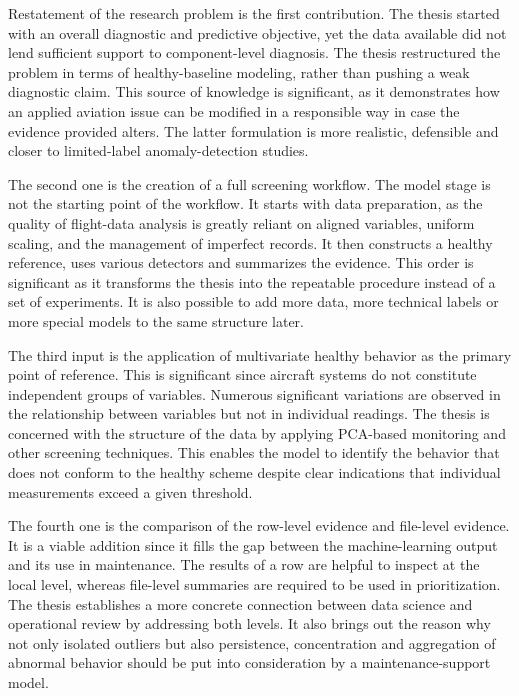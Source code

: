 \documentclass[12pt,a4paper]{report}
\begin{document}
	Restatement of the research problem is the first contribution. The thesis started with an overall diagnostic and predictive objective, yet the data available did not lend sufficient support to component-level diagnosis. The thesis restructured the problem in terms of healthy-baseline modeling, rather than pushing a weak diagnostic claim. This source of knowledge is significant, as it demonstrates how an applied aviation issue can be modified in a responsible way in case the evidence provided alters. The latter formulation is more realistic, defensible and closer to limited-label anomaly-detection studies.
	
	The second one is the creation of a full screening workflow. The model stage is not the starting point of the workflow. It starts with data preparation, as the quality of flight-data analysis is greatly reliant on aligned variables, uniform scaling, and the management of imperfect records. It then constructs a healthy reference, uses various detectors and summarizes the evidence. This order is significant as it transforms the thesis into the repeatable procedure instead of a set of experiments. It is also possible to add more data, more technical labels or more special models to the same structure later.
	
	The third input is the application of multivariate healthy behavior as the primary point of reference. This is significant since aircraft systems do not constitute independent groups of variables. Numerous significant variations are observed in the relationship between variables but not in individual readings. The thesis is concerned with the structure of the data by applying PCA-based monitoring and other screening techniques. This enables the model to identify the behavior that does not conform to the healthy scheme despite clear indications that individual measurements exceed a given threshold.
	
	The fourth one is the comparison of the row-level evidence and file-level evidence. It is a viable addition since it fills the gap between the machine-learning output and its use in maintenance. The results of a row are helpful to inspect at the local level, whereas file-level summaries are required to be used in prioritization. The thesis establishes a more concrete connection between data science and operational review by addressing both levels. It also brings out the reason why not only isolated outliers but also persistence, concentration and aggregation of abnormal behavior should be put into consideration by a maintenance-support model.
	
\end{document}
